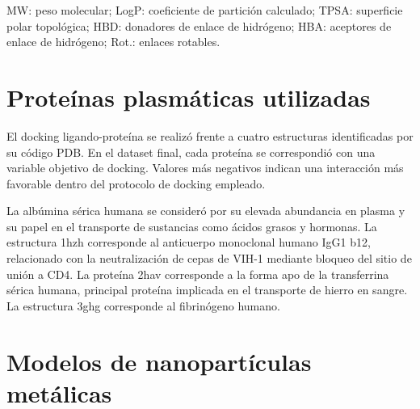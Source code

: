 \documentclass[
  spanish,
  a4paper,
  12pt,
  oneside,
  openany]{memoir}
\begin{document}
\endgroup

MW: peso molecular; LogP: coeficiente de partición calculado; TPSA:
superficie polar topológica; HBD: donadores de enlace de hidrógeno; HBA:
aceptores de enlace de hidrógeno; Rot.: enlaces rotables.

\section{Proteínas plasmáticas utilizadas}

El docking ligando-proteína se realizó frente a cuatro estructuras
identificadas por su código PDB. En el dataset final, cada proteína se
correspondió con una variable objetivo de docking. Valores más negativos
indican una interacción más favorable dentro del protocolo de docking
empleado.

\begin{table}

\caption{\label{tbl-anexo-proteinas}Proteínas consideradas en el docking ligando-proteína.}


\end{table}%

La albúmina sérica humana se consideró por su elevada abundancia en
plasma y su papel en el transporte de sustancias como ácidos grasos y
hormonas. La estructura 1hzh corresponde al anticuerpo monoclonal humano
IgG1 b12, relacionado con la neutralización de cepas de VIH-1 mediante
bloqueo del sitio de unión a CD4. La proteína 2hav corresponde a la
forma apo de la transferrina sérica humana, principal proteína implicada
en el transporte de hierro en sangre. La estructura 3ghg corresponde al
fibrinógeno humano.

\section{Modelos de nanopartículas metálicas}
\end{document}
